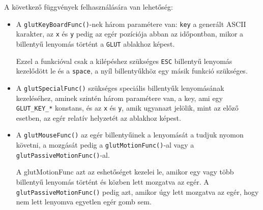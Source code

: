 A következő függvények felhasználására van lehetőség:
\begin{itemize}
\item A \texttt{glutKeyBoardFunc()}-nek három paramétere van: \texttt{key} a generált ASCII karakter, az \texttt{x} és \texttt{y} pedig az egér pozíciója abban az időpontban, mikor a billentyű lenyomás történt a \texttt{GLUT} ablakhoz képest.

Ezzel a funkcióval csak a kilépéshez szükséges \texttt{ESC} billentyű lenyomás kezelődött le és a \texttt{space}, a nyíl billentyűkhöz egy másik funkció szükséges.
\item A \texttt{glutSpecialFunc()} szükséges speciális billentyűk lenyomásának kezeléséhez,  
aminek szintén három paramétere van, a key, ami egy \texttt{GLUT\_KEY\_*} konstans, és az \texttt{x} és \texttt{y}, amik ugyanazt jelölik, mint az előző esetben, az egér relatív helyzetét az ablakhoz képest.
\item A \texttt{glutMouseFunc()} az egér billentyűinek a lenyomását a  tudjuk nyomon követni, a mozgását pedig a \texttt{glutMotionFunc()}-al vagy a \texttt{glutPassiveMotionFunc()}-al. 

A glutMotionFunc azt az eshetőséget kezelei le, amikor egy vagy több billentyű lenyomás történt és közben lett mozgatva az egér. A \texttt{glutPassiveMotionFunc()} pedig azt, amikor úgy lett mozgatva az egér, hogy nem lett lenyomva egyetlen egér gomb sem.
\end{itemize}


